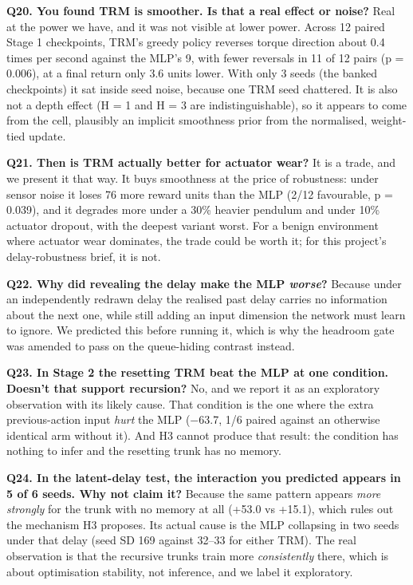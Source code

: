 \documentclass[11pt]{article}
\begin{document}
\textbf{Q20. You found TRM is smoother. Is that a real effect or noise?} Real at the power we have, and it was not visible at lower power. Across 12 paired Stage 1 checkpoints, TRM's greedy policy reverses torque direction about 0.4 times per second against the MLP's 9, with fewer reversals in 11 of 12 pairs (p = 0.006), at a final return only 3.6 units lower. With only 3 seeds (the banked checkpoints) it sat inside seed noise, because one TRM seed chattered. It is also not a depth effect (H = 1 and H = 3 are indistinguishable), so it appears to come from the cell, plausibly an implicit smoothness prior from the normalised, weight-tied update.



\textbf{Q21. Then is TRM actually better for actuator wear?} It is a trade, and we present it that way. It buys smoothness at the price of robustness: under sensor noise it loses 76 more reward units than the MLP (2/12 favourable, p = 0.039), and it degrades more under a 30\% heavier pendulum and under 10\% actuator dropout, with the deepest variant worst. For a benign environment where actuator wear dominates, the trade could be worth it; for this project's delay-robustness brief, it is not.



\textbf{Q22. Why did revealing the delay make the MLP \emph{worse}?} Because under an independently redrawn delay the realised past delay carries no information about the next one, while still adding an input dimension the network must learn to ignore. We predicted this before running it, which is why the headroom gate was amended to pass on the queue-hiding contrast instead.



\textbf{Q23. In Stage 2 the resetting TRM beat the MLP at one condition. Doesn't that support recursion?} No, and we report it as an exploratory observation with its likely cause. That condition is the one where the extra previous-action input \emph{hurt} the MLP ($-$63.7, 1/6 paired against an otherwise identical arm without it). And H3 cannot produce that result: the condition has nothing to infer and the resetting trunk has no memory.



\textbf{Q24. In the latent-delay test, the interaction you predicted appears in 5 of 6 seeds. Why not claim it?} Because the same pattern appears \emph{more strongly} for the trunk with no memory at all (+53.0 vs +15.1), which rules out the mechanism H3 proposes. Its actual cause is the MLP collapsing in two seeds under that delay (seed SD 169 against 32--33 for either TRM). The real observation is that the recursive trunks train more \emph{consistently} there, which is about optimisation stability, not inference, and we label it exploratory.
\end{document}
